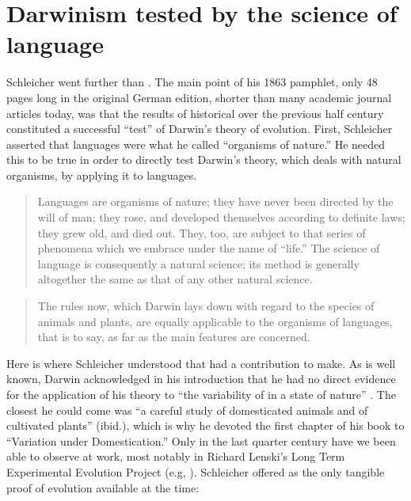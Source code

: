 \documentclass[output=paper,
modfonts
]{LSP/langsci}
\begin{document}
\section{Darwinism tested by the science of language}

Schleicher went further than .  The main point of his 1863 pamphlet, only 48 pages long in the original German edition, shorter than many academic journal articles today, was that the results of historical  over the previous half century constituted a successful ``test'' of Darwin's theory of evolution. First, Schleicher asserted that languages were what he called ``organisms of nature.'' He needed this to be true in order to directly test Darwin's theory, which deals with natural organisms, by applying it to languages.

\begin{quote}
Languages are organisms of nature; they have never been directed by the will of man; they rose, and developed themselves according to definite laws; they grew old, and died out. They, too, are subject to that series of phenomena which we embrace under the name of ``life.'' The science of language is consequently a natural science; its method is generally altogether the same as that of any other natural science. \citep[20--21]{Schleicher1863}
\end{quote}

\begin{quote}
The rules now, which Darwin lays down with regard to the species of animals and plants, are equally applicable to the organisms of languages, that is to say, as far as the main features are concerned. \citep[30]{Schleicher1863}
\end{quote}

Here is where Schleicher understood that  had a contribution to make.  As is well known, Darwin acknowledged in his introduction that he had no direct evidence for the application of his theory to ``the variability of  in a state of nature'' \citep[4]{Darwin1859}. The closest he could come was ``a careful study of domesticated animals and of cultivated plants'' (ibid.), which is why he devoted the first chapter of his book to ``Variation under Domestication.'' Only in the last quarter century have we been able to observe  at work, most notably in Richard Lenski's Long Term Experimental Evolution Project (e.g, \citealt{Tenaillonetal2016}). Schleicher offered  as the only tangible proof of evolution available at the time:
\end{document}
